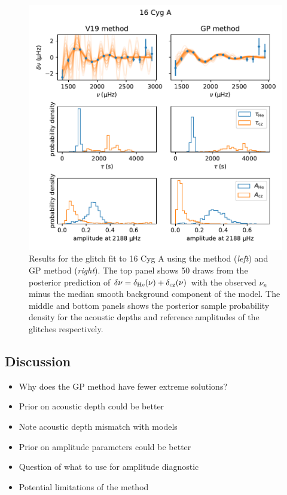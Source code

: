 \begin{figure}
    \centering
    \includegraphics{figures/glitch-16cyga.pdf}
    \caption{Results for the glitch fit to 16 Cyg A using the  method (\emph{left}) and GP method (\emph{right}). The top panel shows 50 draws from the posterior prediction of \(\delta\nu = \delta_{{\mathrm{He}}}(\nu) + \delta_{{\mathrm{cz}}}(\nu)\) with the observed \(\nu_n\) minus the median smooth background component of the model. The middle and bottom panels shows the posterior sample probability density for the acoustic depths and reference amplitudes of the glitches respectively.}
    \label{fig:glitch-16cyga}
\end{figure}

\subsection{Discussion}

\begin{itemize}
    \item Why does the GP method have fewer extreme solutions?
    \item Prior on acoustic depth could be better
    \item Note acoustic depth mismatch with models
    \item Prior on amplitude parameters could be better
    \item Question of what to use for amplitude diagnostic
    \item Potential limitations of the method
\end{itemize}

